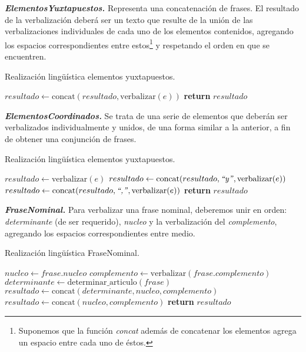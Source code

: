 \medskip
\noindent
\textbf{\emph{ElementosYuxtapuestos.}} Representa una concatenación de frases. El resultado de la verbalización deberá ser un texto que resulte de la unión de las verbalizaciones individuales de cada uno de los elementos contenidos, agregando los espacios correspondientes entre estos\footnote{Suponemos que la función \emph{concat} además de concatenar los elementos agrega un espacio entre cada uno de éstos.} y respetando el orden en que se encuentren. 

\begin{algorithm}[H]
\caption{Realización lingüística elementos yuxtapuestos.} 
\begin{algorithmic}[1]
\State $resultado\gets \text{concat}(resultado, \text{verbalizar}(e))$
\EndFor
\State \textbf{return} $resultado$
\EndFunction
\end{algorithmic}
\end{algorithm}

\medskip
\noindent
\textbf{\emph{ElementosCoordinados.}} Se trata de una serie de elementos que deberán ser verbalizados individualmente y unidos, de una forma similar a la anterior, a fin de obtener una conjunción de frases.

\begin{algorithm}[H]
\caption{Realización lingüística elementos yuxtapuestos.}
\begin{algorithmic}[1]
\State $resultado\gets \text{verbalizar}(e)$
\State $resultado\gets \text{concat}(resultado, \text{\emph{``y''}}, \text{verbalizar}(e))$
\Else
\State $resultado\gets \text{concat}(resultado, \text{\emph{``,''}}, \text{verbalizar}(e))$
\EndIf
\EndFor
\State \textbf{return} $resultado$
\EndFunction
\end{algorithmic}
\end{algorithm}

\medskip
\noindent
\textbf{\emph{FraseNominal.}} Para verbalizar una frase nominal, deberemos unir en orden: \emph{determinante} (de ser requerido), \emph{nucleo} y la verbalización del \emph{complemento}, agregando los espacios correspondientes entre medio.

\begin{algorithm}[H]
\caption{Realización lingüística FraseNominal.}
\begin{algorithmic}[1]
\State $nucleo\gets frase.nucleo$
\State $complemento\gets \text{verbalizar}(frase.complemento)$
\State $determinante\gets \text{determinar\_articulo}(frase)$
\State $resultado\gets \text{concat}(determinante, nucleo, complemento)$
\Else
\State $resultado\gets \text{concat}(nucleo, complemento)$
\EndIf
\Statex
\State \textbf{return} $resultado$
\EndFunction
\end{algorithmic}
\end{algorithm}

